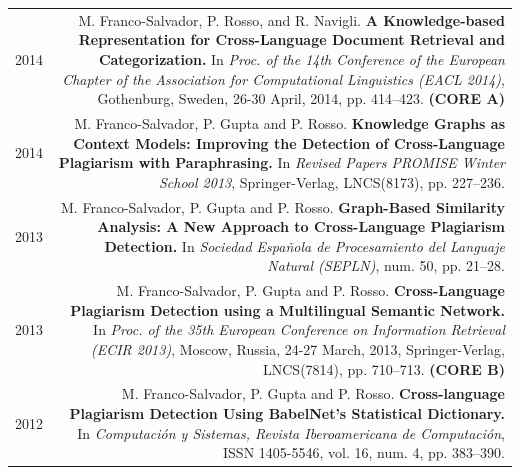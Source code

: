 \documentclass[10pt]{article}
\begin{document}
\begin{tabular}{L!{\VRule}R}
	2014&M. Franco-Salvador, P. Rosso, and R. Navigli. \textbf{A Knowledge-based Representation for Cross-Language Document Retrieval and Categorization.}
	In \emph{Proc. of the 14th Conference of the European Chapter of the Association for Computational Linguistics (EACL 2014)}, Gothenburg, Sweden, 26-30 April, 2014, pp. 414--423. \textbf{(CORE A)} \vspace{5pt}\\
	2014&M. Franco-Salvador, P. Gupta and P. Rosso. \textbf{Knowledge Graphs as Context Models: Improving the Detection of Cross-Language Plagiarism with Paraphrasing.}
	In \emph{Revised Papers PROMISE Winter School 2013}, Springer-Verlag, LNCS(8173), pp. 227--236.\vspace{5pt}\\
	2013&M. Franco-Salvador, P. Gupta and P. Rosso. \textbf{Graph-Based Similarity Analysis: A New Approach to Cross-Language Plagiarism Detection.}
	In \emph{Sociedad Espa{\~n}ola de Procesamiento del Languaje Natural (SEPLN)}, num. 50, pp. 21--28. \vspace{5pt}\\
	2013&M. Franco-Salvador, P. Gupta and P. Rosso. \textbf{Cross-Language Plagiarism Detection using a Multilingual Semantic Network.}
	In \emph{Proc. of the 35th European Conference on Information Retrieval (ECIR 2013)}, Moscow, Russia, 24-27 March, 2013, Springer-Verlag, LNCS(7814), pp. 710--713. \textbf{(CORE B)}\vspace{5pt}\\
	2012&M. Franco-Salvador, P. Gupta and P. Rosso. \textbf{Cross-language Plagiarism Detection Using BabelNet's Statistical Dictionary.}
	In \emph{Computaci{\'o}n y Sistemas, Revista Iberoamericana de Computaci{\'o}n}, ISSN 1405-5546, vol. 16, num. 4, pp. 383--390.\vspace{5pt}\\
\end{tabular}
\end{document}
